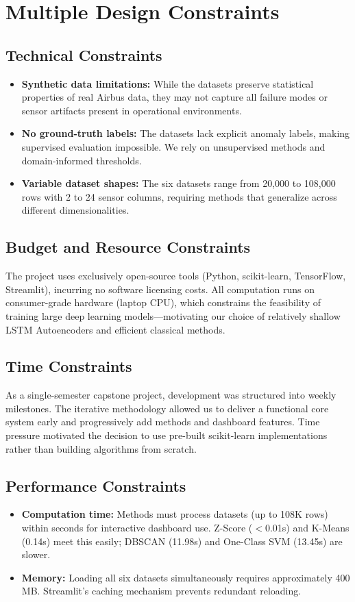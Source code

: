 \documentclass{CLS_zhou430}
\begin{document}
\chapter{Multiple Design Constraints}

\section{Technical Constraints}
\begin{itemize}
    \item \textbf{Synthetic data limitations:} While the datasets preserve statistical properties of real Airbus data, they may not capture all failure modes or sensor artifacts present in operational environments.
    \item \textbf{No ground-truth labels:} The datasets lack explicit anomaly labels, making supervised evaluation impossible. We rely on unsupervised methods and domain-informed thresholds.
    \item \textbf{Variable dataset shapes:} The six datasets range from 20,000 to 108,000 rows with 2 to 24 sensor columns, requiring methods that generalize across different dimensionalities.
\end{itemize}

\section{Budget and Resource Constraints}
The project uses exclusively open-source tools (Python, scikit-learn, TensorFlow, Streamlit), incurring no software licensing costs. All computation runs on consumer-grade hardware (laptop CPU), which constrains the feasibility of training large deep learning models---motivating our choice of relatively shallow LSTM Autoencoders and efficient classical methods.

\section{Time Constraints}
As a single-semester capstone project, development was structured into weekly milestones. The iterative methodology allowed us to deliver a functional core system early and progressively add methods and dashboard features. Time pressure motivated the decision to use pre-built scikit-learn implementations rather than building algorithms from scratch.

\section{Performance Constraints}
\begin{itemize}
    \item \textbf{Computation time:} Methods must process datasets (up to 108K rows) within seconds for interactive dashboard use. Z-Score ($<$0.01s) and K-Means (0.14s) meet this easily; DBSCAN (11.98s) and One-Class SVM (13.45s) are slower.
    \item \textbf{Memory:} Loading all six datasets simultaneously requires approximately 400 MB. Streamlit's caching mechanism prevents redundant reloading.
\end{itemize}
\end{document}
